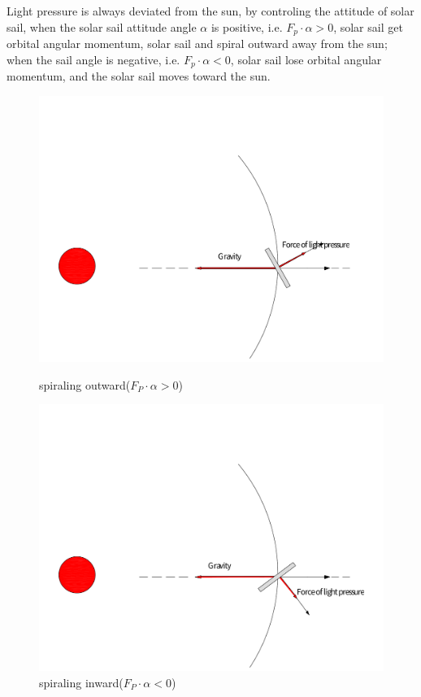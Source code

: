 \documentclass[../Paper.tex]{subfiles}
\begin{document}
Light pressure is always deviated from the sun, by controling the attitude of solar sail, when the solar sail attitude angle $\alpha$ is positive, i.e. $F_p\cdot\alpha>0$, solar sail get orbital angular momentum, solar sail and spiral outward away from the sun; when the sail angle is negative, i.e. $F_p\cdot\alpha<0$, solar sail lose orbital angular momentum, and the solar sail moves toward the sun. 

\begin{figure}[H]
 \begin{minipage}[t]{0.5\linewidth}
 \centering{}
 \includegraphics[scale=0.25]{../Figures/accelerate.pdf}
 \caption{spiraling outward($F_P\cdot\alpha>0$)}
 \label{fig:side:a}
 \end{minipage}
 \begin{minipage}[t]{0.5\linewidth}
 \centering{}
 \includegraphics[scale=0.25]{../Figures/decrease.pdf}
 \caption{spiraling inward($F_P\cdot\alpha<0$)}
 \label{fig:side:b}
 \end{minipage}
\end{figure}
\end{document}
